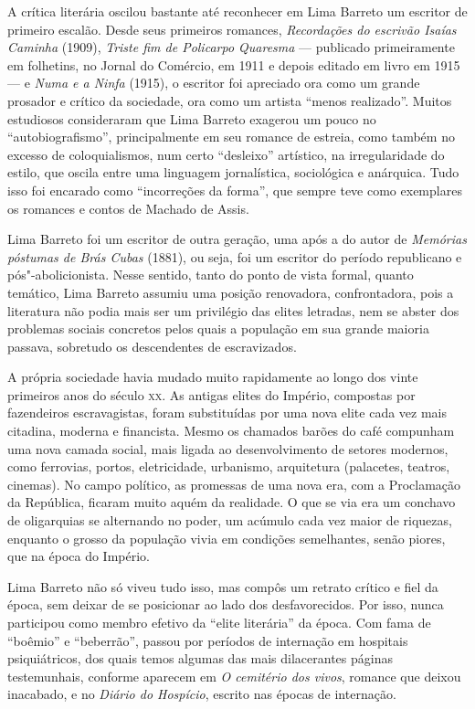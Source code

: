 \documentclass[11pt]{extarticle}
\begin{document}
{{A crítica literária oscilou bastante até reconhecer em Lima Barreto um
escritor de primeiro escalão. Desde seus primeiros romances,
\emph{Recordações do escrivão Isaías Caminha} (1909), \emph{Triste fim
de Policarpo Quaresma} --- publicado primeiramente em folhetins, no
Jornal do Comércio, em 1911 e depois editado em livro em 1915 --- e
\emph{Numa e a Ninfa} (1915), o escritor foi apreciado ora como um
grande prosador e crítico da sociedade, ora como um artista ``menos
realizado''. Muitos estudiosos consideraram que Lima Barreto exagerou um
pouco no ``autobiografismo'', principalmente em seu romance de estreia,
como também no excesso de coloquialismos, num certo ``desleixo''
artístico, na irregularidade do estilo, que oscila entre uma linguagem
jornalística, sociológica e anárquica. Tudo isso foi encarado como
``incorreções da forma'', que sempre teve como exemplares os romances e
contos de Machado de Assis.

Lima Barreto foi um escritor de outra geração, uma após a do autor de
\emph{Memórias póstumas de Brás Cubas} (1881), ou seja, foi um escritor
do período republicano e pós"-abolicionista. Nesse sentido, tanto do
ponto de vista formal, quanto temático, Lima Barreto assumiu uma posição
renovadora, confrontadora, pois a literatura não podia mais ser um
privilégio das elites letradas, nem se abster dos problemas sociais
concretos pelos quais a população em sua grande maioria passava,
sobretudo os descendentes de escravizados.

A própria sociedade havia mudado muito rapidamente ao longo dos vinte
primeiros anos do século \textsc{xx}. As antigas elites do Império, compostas por
fazendeiros escravagistas, foram substituídas por uma nova elite cada
vez mais citadina, moderna e financista. Mesmo os chamados barões do
café compunham uma nova camada social, mais ligada ao desenvolvimento de
setores modernos, como ferrovias, portos, eletricidade, urbanismo,
arquitetura (palacetes, teatros, cinemas). No campo político, as
promessas de uma nova era, com a Proclamação da República, ficaram muito
aquém da realidade. O que se via era um conchavo de oligarquias se
alternando no poder, um acúmulo cada vez maior de riquezas, enquanto o
grosso da população vivia em condições semelhantes, senão piores, que na
época do Império.

Lima Barreto não só viveu tudo isso, mas compôs um retrato crítico e
fiel da época, sem deixar de se posicionar ao lado dos desfavorecidos.
Por isso, nunca participou como membro efetivo da ``elite literária'' da
época. Com fama de ``boêmio'' e ``beberrão'', passou por períodos de
internação em hospitais psiquiátricos, dos quais temos algumas das mais
dilacerantes páginas testemunhais, conforme aparecem em \emph{O
cemitério dos vivos}, romance que deixou inacabado, e no \emph{Diário do
Hospício}, escrito nas épocas de internação.

}}
\end{document}
